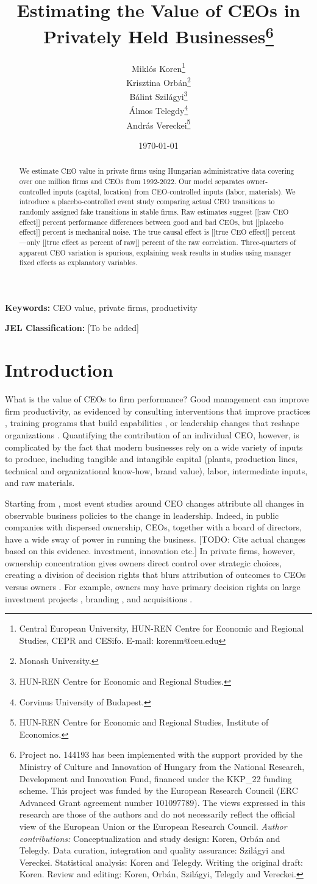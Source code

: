 \documentclass[11pt,a4paper]{article}
\title{Estimating the Value of CEOs in Privately Held Businesses\thanks{Project no. 144193 has been implemented with the support provided by the Ministry of Culture and Innovation of Hungary from the National Research, Development and Innovation Fund, financed under the KKP\_22 funding scheme. This project was funded by the European Research Council (ERC Advanced Grant agreement number 101097789). The views expressed in this research are those of the authors and do not necessarily reflect the official view of the European Union or the European Research Council. \emph{Author contributions:} Conceptualization and study design: Koren, Orbán and Telegdy. Data curation, integration and quality assurance: Szilágyi and Vereckei. Statistical analysis: Koren and Telegdy. Writing the original draft: Koren. Review and editing: Koren, Orbán, Szilágyi, Telegdy and Vereckei.}}
\author{Miklós Koren\thanks{Central European University, HUN-REN Centre for Economic and Regional Studies, CEPR and CESifo. E-mail: korenm@ceu.edu} \\
        Krisztina Orbán\thanks{Monash University.} \\
        Bálint Szilágyi\thanks{HUN-REN Centre for Economic and Regional Studies.} \\
        Álmos Telegdy\thanks{Corvinus University of Budapest.} \\
        András Vereckei\thanks{HUN-REN Centre for Economic and Regional Studies, Institute of Economics.}}
\date{\today}
\begin{document}
\maketitle

\begin{abstract}
We estimate CEO value in private firms using Hungarian administrative data covering over one million firms and CEOs from 1992-2022. Our model separates owner-controlled inputs (capital, location) from CEO-controlled inputs (labor, materials). We introduce a placebo-controlled event study comparing actual CEO transitions to randomly assigned fake transitions in stable firms. Raw estimates suggest [[raw CEO effect]] percent performance differences between good and bad CEOs, but [[placebo effect]] percent is mechanical noise. The true causal effect is [[true CEO effect]] percent—only [[true effect as percent of raw]] percent of the raw correlation. Three-quarters of apparent CEO variation is spurious, explaining weak results in studies using manager fixed effects as explanatory variables.
\end{abstract}

\textbf{Keywords:} CEO value, private firms, productivity

\textbf{JEL Classification:} [To be added]

\newpage

\section{Introduction}

What is the value of CEOs to firm performance? Good management can improve firm productivity, as evidenced by consulting interventions that improve practices \citep{bloom2013does}, training programs that build capabilities \citep{}, or leadership changes that reshape organizations \citep{Bertrand2003-io,bennedsen2020ceos,metcalfe2023managers}. Quantifying the contribution of an individual CEO, however, is complicated by the fact that modern businesses rely on a wide variety of inputs to produce, including tangible and intangible capital (plants, production lines, technical and organizational know-how, brand value), labor, intermediate inputs, and raw materials.

Starting from \citet{Bertrand2003-io}, most event studies around CEO changes attribute all changes in observable business policies to the change in leadership. Indeed, in public companies with dispersed ownership, CEOs, together with a board of directors, have a wide sway of power in running the business. [TODO: Cite actual changes based on this evidence. investment, innovation etc.] In private firms, however, ownership concentration gives owners direct control over strategic choices, creating a division of decision rights that blurs attribution of outcomes to CEOs versus owners \citep{fama1983separation, jensen1976theory, burkart2003family}. For example, owners may have primary decision rights on large investment projects \citep{}, branding \citep{}, and acquisitions \citep{}.
\end{document}
